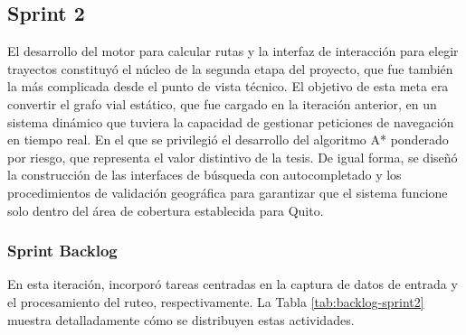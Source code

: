 \subsection{Sprint 2}

El desarrollo del motor para calcular rutas y la interfaz de interacción para elegir trayectos constituyó el núcleo de la segunda etapa del proyecto, que fue también la más complicada desde el punto de vista técnico. El objetivo de esta meta era convertir el grafo vial estático, que fue cargado en la iteración anterior, en un sistema dinámico que tuviera la capacidad de gestionar peticiones de navegación en tiempo real. En el que se privilegió el desarrollo del algoritmo A* ponderado por riesgo, que representa el valor distintivo de la tesis. De igual forma, se diseñó la construcción de las interfaces de búsqueda con autocompletado y los procedimientos de validación geográfica para garantizar que el sistema funcione solo dentro del área de cobertura establecida para Quito.

\subsubsection{Sprint Backlog}

En esta iteración, incorporó tareas centradas en la captura de datos de entrada y el procesamiento del ruteo, respectivamente. La Tabla \ref{tab:backlog-sprint2} muestra detalladamente cómo se distribuyen estas actividades.

